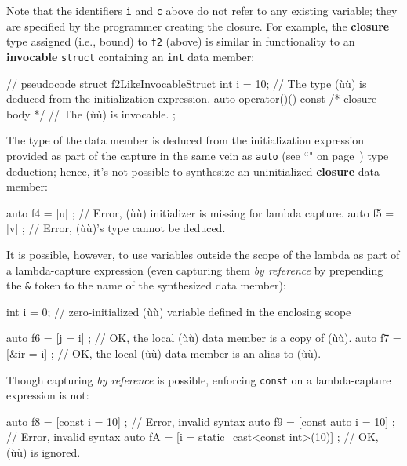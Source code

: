 \noindent Note that the identifiers \texttt{i} and \texttt{c} above do not refer
to any existing variable; they are specified by the programmer creating
the closure. For example, the \textbf{closure} type assigned (i.e.,
bound) to \texttt{f2} (above) is similar in functionality to an
\textbf{invocable} \texttt{struct} containing an \texttt{int} data
member:

\begin{emcppslisting}[emcppsstandards={c++14}]
// pseudocode
struct f2LikeInvocableStruct
{
    int i = 10;  // The type (ù{}ù) is deduced from the initialization expression.
    auto operator()() const { /* closure body */ }  // The (ù{}ù) is invocable.
};
\end{emcppslisting}
    
\noindent The type of the data member is deduced from the initialization
expression provided as part of the capture in the same vein as
\texttt{auto} (see ``" on page~\pageref{auto-feature}) type deduction; hence, it's not possible to
synthesize an uninitialized \textbf{closure} data member:

\begin{emcppslisting}
auto f4 = [u]{ };    // Error, (ù{}ù) initializer is missing for lambda capture.
auto f5 = [v{}]{ };  // Error, (ù{}ù)'s type cannot be deduced.
\end{emcppslisting}
    
\noindent It is possible, however, to use variables outside the scope of the
lambda as part of a lambda-capture expression (even capturing them \textit{by
reference} by prepending the \texttt{\&} token to the name of the
synthesized data member):

\begin{emcppslisting}[emcppsstandards={c++14}]
int i = 0;  // zero-initialized (ù{}ù) variable defined in the enclosing scope

auto f6 = [j   = i]{ };  // OK, the local (ù{}ù) data member is a copy of (ù{}ù).
auto f7 = [&ir = i]{ };  // OK, the local (ù{}ù) data member is an alias to (ù{}ù).
\end{emcppslisting}
    
\noindent Though capturing \textit{by reference} is possible, enforcing \texttt{const} on a lambda-capture expression is not:

\begin{emcppslisting}[emcppsstandards={c++14}]
auto f8 = [const i = 10]{ };                    // Error, invalid syntax
auto f9 = [const auto i = 10]{ };               // Error, invalid syntax
auto fA = [i = static_cast<const int>(10)]{ };  // OK, (ù{}ù) is ignored.
\end{emcppslisting}
    
